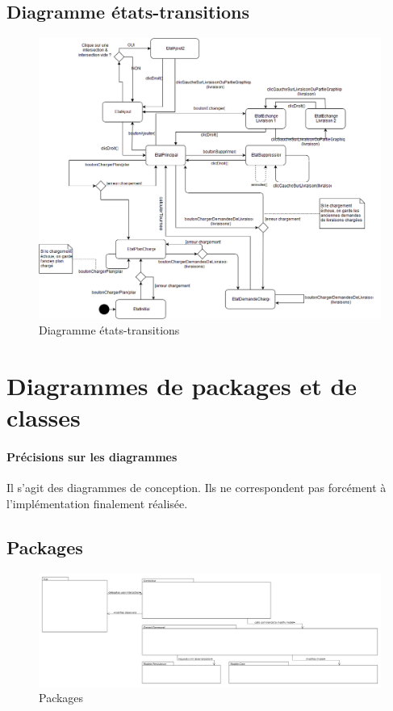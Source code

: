 \documentclass[10pt,a4paper]{book}
\begin{document}
\subsection{Diagramme états-transitions}
\begin{figure}[h!]
    \centering
    \includegraphics[scale=0.5]{diag-et-trans.png}
    \caption{Diagramme états-transitions}
\end{figure}
\newpage
\section{Diagrammes de packages et de classes}
\paragraph{Précisions sur les diagrammes}
Il s'agit des diagrammes de conception. Ils ne correspondent pas forcément à l'implémentation finalement réalisée.
\subsection{Packages}
\begin{figure}[h!]
    \centering
    \includegraphics[scale=0.2]{packages.png}
    \caption{Packages}
\end{figure}
\newpage
\end{document}

